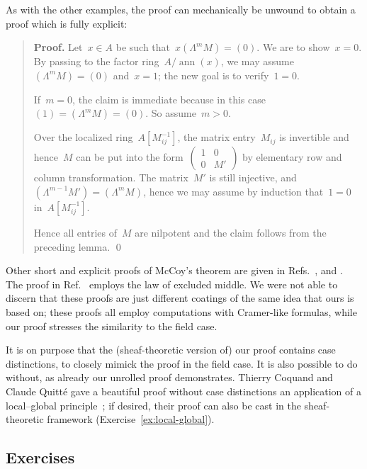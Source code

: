 \documentclass{ws-rv9x6}
\renewcommand{\_}{\mathpunct{.}}
\newcommand{\?}{\,{:}\,}
\newcommand{\ann}{\operatorname{ann}}
\begin{document}
As with the other examples, the proof can mechanically be unwound to obtain a proof
which is fully explicit:

\begin{quote}
\textbf{Proof.} Let~$x \in A$ be such that~$x (\Lambda^m M) = (0)$. We are to
show~$x = 0$. By passing to the factor ring~$A/\ann(x)$, we may
assume~$(\Lambda^m M) = (0)$ and~$x = 1$; the new goal is to verify~$1 = 0$.

If~$m = 0$, the claim is immediate because in this case~$(1) = (\Lambda^m M) =
(0)$. So assume~$m > 0$.

Over the localized ring~$A[M_{ij}^{-1}]$, the matrix entry~$M_{ij}$ is
invertible and hence~$M$ can be put into the
form~$\left(\begin{smallmatrix}1&0\\0&M'\end{smallmatrix}\right)$ by elementary
row and column transformation. The matrix~$M'$ is still injective,
and~$(\Lambda^{m-1} M') = (\Lambda^m M)$, hence we may assume by induction
that~$1 = 0$ in~$A[M_{ij}^{-1}]$.

Hence all entries of~$M$ are nilpotent and the claim follows from the preceding
lemma. \qed
\end{quote}

Other short and explicit proofs of McCoy's theorem are given in
Refs.~,
\cite[Theorem~5.22]{lombardi-quitte:constructive-algebra} and
\cite[Exercise~5.23A(3)]{lam:exercises}. The proof in
Ref.~\cite[Proposition~III.8.2.3]{bourbaki:alg} employs the law of excluded
middle. We were not able to discern that these proofs are just different
coatings of the same idea that ours is based on; these proofs all employ
computations with Cramer-like formulas, while our proof stresses the similarity
to the field case.

It is on purpose that the (sheaf-theoretic version of) our proof contains case
distinctions, to closely mimick the proof in the field case. It is also
possible to do without, as already our unrolled proof demonstrates. Thierry
Coquand and Claude Quitté gave a beautiful proof without case distinctions an
application of a local--global
principle~\cite[Theorem~2.4]{coquand-quitte:constructive-finite-free-resolutions};
if desired, their proof can also be cast in the sheaf-theoretic framework
(Exercise~\ref{ex:local-global}).


\subsection*{Exercises}
\end{document}
